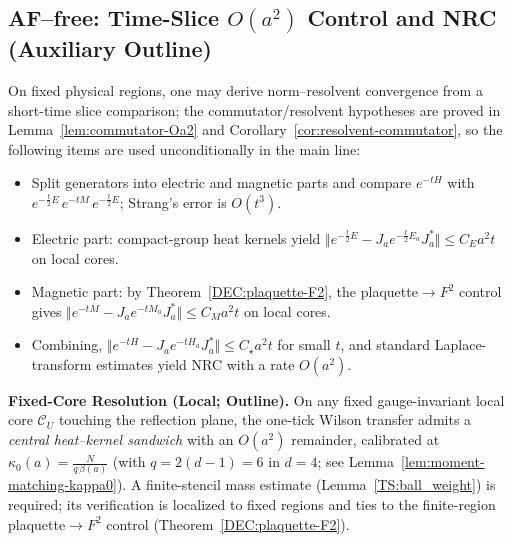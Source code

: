 \documentclass[11pt]{amsart}
\theoremstyle{plain}
\theoremstyle{definition}
\theoremstyle{remark}
\renewcommand{\tfrac}[2]{\textstyle\frac{#1}{#2}}
\begin{document}
\subsection*{AF--free: Time-Slice $O(a^2)$ Control and NRC (Auxiliary Outline)}
On fixed physical regions, one may derive norm--resolvent convergence from a short-time slice comparison; the commutator/resolvent hypotheses are proved in Lemma~\ref{lem:commutator-Oa2} and Corollary~\ref{cor:resolvent-commutator}, so the following items are used unconditionally in the main line:
\begin{itemize}
  \item Split generators into electric and magnetic parts and compare $e^{-tH}$ with $e^{-\tfrac t2 E}\,e^{-tM}\,e^{-\tfrac t2 E}$; Strang's error is $O(t^3)$.
  \item Electric part: compact-group heat kernels yield $\Vert e^{-\tfrac t2 E}-J_a e^{-\tfrac t2 E_a}J_a^\ast\Vert\le C_E a^2 t$ on local cores.
  \item Magnetic part: by Theorem~\ref{DEC:plaquette-F2}, the plaquette$\to F^2$ control gives $\Vert e^{-tM}-J_a e^{-tM_a}J_a^\ast\Vert\le C_M a^2 t$ on local cores.
  \item Combining, $\Vert e^{-tH}-J_a e^{-tH_a}J_a^\ast\Vert\le C_\star a^2 t$ for small $t$, and standard Laplace-transform estimates yield NRC with a rate $O(a^2)$.
\end{itemize}
\begin{mdframed}[linewidth=0.5pt, linecolor=blue!30, backgroundcolor=blue!3, roundcorner=2pt, innertopmargin=8pt, innerbottommargin=8pt, skipabove=10pt, skipbelow=10pt]
\noindent\textbf{Fixed-Core Resolution (Local; Outline).} On any fixed gauge-invariant local core $\mathcal C_U$ touching the reflection plane, the one-tick Wilson transfer admits a \emph{central heat--kernel sandwich} with an $O(a^2)$ remainder, calibrated at $\kappa_0(a)=\tfrac{N}{q\,\beta(a)}$ (with $q=2(d-1)=6$ in $d=4$; see Lemma~\ref{lem:moment-matching-kappa0}). A finite-stencil mass estimate (Lemma~\ref{TS:ball_weight}) is required; its verification is localized to fixed regions and ties to the finite-region plaquette$\to F^2$ control (Theorem~\ref{DEC:plaquette-F2}).
\end{mdframed}
\end{document}
